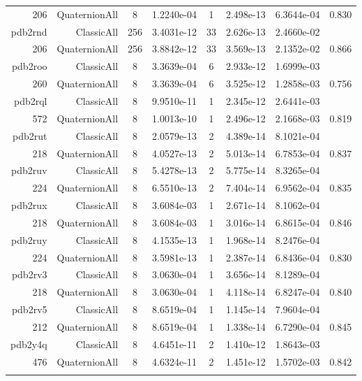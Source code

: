 \begin{xltabular}{\textwidth}{r|rcS[table-format=1.4e+2]cS[table-format=1.3e+2]S[table-format=1.4e+2]S[table-format=-1.3]}
206 & QuaternionAll & 8 & 1.2240e-04 & 1 & 2.498e-13 & 6.3644e-04 & 0.830\\  \addlinespace
pdb2rnd & ClassicAll & 256 & 3.4031e-12 & 33 & 2.626e-13 & 2.4660e-02 & \\
206 & QuaternionAll & 256 & 3.8842e-12 & 33 & 3.569e-13 & 2.1352e-02 & 0.866\\  \addlinespace
pdb2roo & ClassicAll & 8 & 3.3639e-04 & 6 & 2.933e-12 & 1.6999e-03 & \\
260 & QuaternionAll & 8 & 3.3639e-04 & 6 & 3.525e-12 & 1.2858e-03 & 0.756\\  \addlinespace
pdb2rql & ClassicAll & 8 & 9.9510e-11 & 1 & 2.345e-12 & 2.6441e-03 & \\
572 & QuaternionAll & 8 & 1.0013e-10 & 1 & 2.496e-12 & 2.1668e-03 & 0.819\\  \addlinespace
pdb2rut & ClassicAll & 8 & 2.0579e-13 & 2 & 4.389e-14 & 8.1021e-04 & \\
218 & QuaternionAll & 8 & 4.0527e-13 & 2 & 5.013e-14 & 6.7853e-04 & 0.837\\  \addlinespace
pdb2ruv & ClassicAll & 8 & 5.4278e-13 & 2 & 5.775e-14 & 8.3265e-04 & \\
224 & QuaternionAll & 8 & 6.5510e-13 & 2 & 7.404e-14 & 6.9562e-04 & 0.835\\  \addlinespace
pdb2rux & ClassicAll & 8 & 3.6084e-03 & 1 & 2.671e-14 & 8.1062e-04 & \\
218 & QuaternionAll & 8 & 3.6084e-03 & 1 & 3.016e-14 & 6.8615e-04 & 0.846\\  \addlinespace
pdb2ruy & ClassicAll & 8 & 4.1535e-13 & 1 & 1.968e-14 & 8.2476e-04 & \\
224 & QuaternionAll & 8 & 3.5981e-13 & 1 & 2.387e-14 & 6.8436e-04 & 0.830\\  \addlinespace
pdb2rv3 & ClassicAll & 8 & 3.0630e-04 & 1 & 3.656e-14 & 8.1289e-04 & \\
218 & QuaternionAll & 8 & 3.0630e-04 & 1 & 4.118e-14 & 6.8247e-04 & 0.840\\  \addlinespace
pdb2rv5 & ClassicAll & 8 & 8.6519e-04 & 1 & 1.145e-14 & 7.9604e-04 & \\
212 & QuaternionAll & 8 & 8.6519e-04 & 1 & 1.338e-14 & 6.7290e-04 & 0.845\\  \addlinespace
pdb2y4q & ClassicAll & 8 & 4.6451e-11 & 2 & 1.410e-12 & 1.8643e-03 & \\
476 & QuaternionAll & 8 & 4.6324e-11 & 2 & 1.451e-12 & 1.5702e-03 & 0.842\\  \addlinespace
\end{xltabular}
